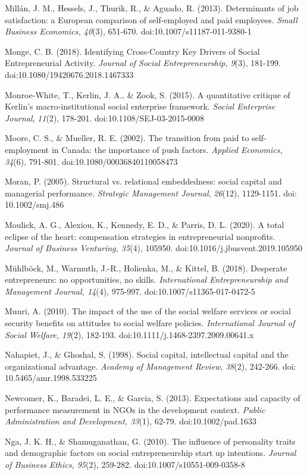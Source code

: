 \documentclass{article}
\begin{document}
Millán, J. M., Hessels, J., Thurik, R., \& Aguado, R. (2013). Determinants of job satisfaction: a European comparison of self-employed and paid employees. \emph{Small Business Economics, 40}(3), 651-670. doi:10.1007/s11187-011-9380-1

Monge, C. B. (2018). Identifying Cross-Country Key Drivers of Social Entrepreneurial Activity. \emph{Journal of Social Entrepreneurship, 9}(3), 181-199. doi:10.1080/19420676.2018.1467333

Monroe-White, T., Kerlin, J. A., \& Zook, S. (2015). A quantitative critique of Kerlin's macro-institutional social enterprise framework. \emph{Social Enterprise Journal}, \emph{11}(2), 178-201. doi:10.1108/SEJ-03-2015-0008

Moore, C. S., \& Mueller, R. E. (2002). The transition from paid to self-employment in Canada: the importance of push factors. \emph{Applied Economics, 34}(6), 791-801. doi:10.1080/00036840110058473

Moran, P. (2005). Structural vs. relational embeddedness: social capital and managerial performance. \emph{Strategic Management Journal}, \emph{26}(12), 1129-1151. doi: 10.1002/smj.486

Moulick, A. G., Alexiou, K., Kennedy, E. D., \& Parris, D. L. (2020). A total eclipse of the heart: compensation strategies in entrepreneurial nonprofits. \emph{Journal of Business Venturing, 35}(4), 105950. doi:10.1016/j.jbusvent.2019.105950

Mühlböck, M., Warmuth, J.-R., Holienka, M., \& Kittel, B. (2018). Desperate entrepreneurs: no opportunities, no skills. \emph{International Entrepreneurship and Management Journal, 14}(4), 975-997. doi:10.1007/s11365-017-0472-5

Muuri, A. (2010). The impact of the use of the social welfare services or social security benefits on attitudes to social welfare policies. \emph{International Journal of Social Welfare, 19}(2), 182-193. doi:10.1111/j.1468-2397.2009.00641.x

Nahapiet, J., \& Ghoshal, S. (1998). Social capital, intellectual capital and the organizational advantage. \emph{Academy of Management Review}, \emph{38}(2), 242-266. doi: 10.5465/amr.1998.533225

Newcomer, K., Baradei, L. E., \& Garcia, S. (2013). Expectations and capacity of performance measurement in NGOs in the development context. \emph{Public Administration and Development, 33}(1), 62-79. doi:10.1002/pad.1633

Nga, J. K. H., \& Shamuganathan, G. (2010). The influence of personality traits and demographic factors on social entrepreneurship start up intentions. \emph{Journal of Business Ethics, 95}(2), 259-282. doi:10.1007/s10551-009-0358-8
\end{document}
